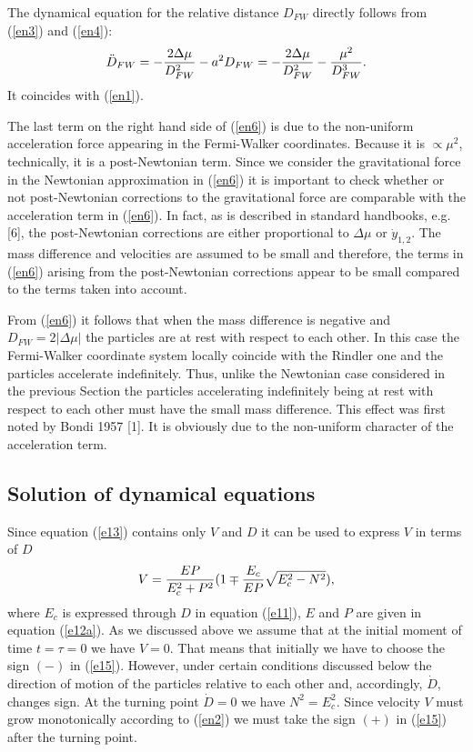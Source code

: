 \documentclass[aip,nofootinbib]{revtex4}
\begin{document}
The dynamical equation for the relative distance $D_{FW}$ directly
follows from (\ref{en3}) and (\ref{en4}):
\begin{equation}
\ddot D_{FW}=-{2\Delta \mu \over D_{FW}^{2}}-a^2D_{FW}=-{2\Delta
\mu \over D_{FW}^{2}}-{\mu^2\over D_{FW}^{3}}.
 \label{en6}
\end{equation}
It coincides with (\ref{en1}).

The last term on the right hand side of (\ref{en6}) is due to the
non-uniform acceleration force appearing in the Fermi-Walker
coordinates. Because it is $\propto \mu^{2}$, technically, it is a
post-Newtonian term. Since we consider the gravitational  force in
the Newtonian approximation in (\ref{en6}) it is important to
check whether or not post-Newtonian corrections to the
gravitational force are comparable with the acceleration term in
(\ref{en6}). In fact, as is described in standard handbooks, e.g.
[6], the post-Newtonian corrections are either proportional to
$\Delta \mu $ or $\dot y_{1,2}$. The mass difference and
velocities are assumed to be small and therefore, the terms in
(\ref{en6}) arising from the post-Newtonian corrections appear to
be small compared to the terms taken into account.

From (\ref{en6}) it follows that when the mass difference is
negative and $D_{FW}=2|\Delta \mu |$ the particles are at rest
with respect to each other. In this case the Fermi-Walker
coordinate system locally coincide with the Rindler one and the
particles accelerate indefinitely. Thus, unlike the Newtonian case
considered in the previous Section the particles accelerating
indefinitely being at rest with respect to each other must have
the small mass difference. This effect was first noted by Bondi
1957 [1]. It is obviously due to the non-uniform character of the
acceleration term.

\subsection{Solution of dynamical equations}


Since equation (\ref{e13}) contains only $V$ and $D$ it can be
used to express $V$ in terms of $D$
\begin{equation}
V={EP\over E_c^2+P^{2}}(1\mp {E_c\over EP}\sqrt{E_{c}^{2}-N^{2}}),
\label{e15}
\end{equation}
where $E_{c}$ is expressed through $D$ in equation (\ref{e11}),
$E$ and $P$ are given in equation (\ref{e12a}). As we discussed
above we assume that at the initial moment of time $t=\tau=0$ we
have $V=0$. That means that initially we have to choose the sign
$(-)$ in (\ref{e15}). However, under certain conditions discussed
below the direction of motion of the particles relative to each
other and, accordingly, $\dot D$, changes sign. At the turning
point $\dot D=0$ we have $N^{2}=E_{c}^2$. Since velocity $V$ must
grow monotonically according to (\ref{en2}) we must take the sign
$(+)$ in (\ref{e15}) after the turning point.
\end{document}
